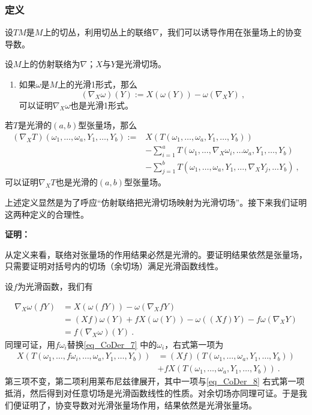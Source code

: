 \subsubsection{定义}
设$TM$是$M$上的切丛，利用切丛上的联络$\nabla$，我们可以诱导作用在张量场上的协变导数。
\begin{theorem}{}
设$M$上的仿射联络为$\nabla$；$X$与$Y$是光滑切场。
\begin{enumerate}
\item 如果$\omega$是$M$上的光滑1形式，那么
\begin{equation}\label{eq_CoDer_9}
\left(\nabla_X \omega\right)(Y):=X(\omega(Y))-\omega\left(\nabla_X Y\right)~,
\end{equation}
可以证明$\nabla_X \omega$也是光滑1形式。
\end{enumerate}
\end{theorem}
若$T$是光滑的$(a,b)$型张量场，那么
\begin{equation}\label{eq_CoDer_7}
\begin{aligned}
\left(\nabla_X T\right)\left(\omega_1, \ldots, \omega_a, Y_1, \ldots, Y_b\right):= & X\left(T\left(\omega_1, \ldots, \omega_a, Y_1, \ldots, Y_b\right)\right) \\
& -\sum_{i=1}^a T\left(\omega_1, \ldots, \nabla_X \omega_i, \ldots \omega_a, Y_1, \ldots, Y_b\right) \\
& -\sum_{j=1}^b T\left(\omega_1, \ldots, \omega_a, Y_1, \ldots, \nabla_X Y_j, \ldots Y_b\right)~,
\end{aligned}
\end{equation}
可以证明$\nabla_X T$也是光滑的$(a,b)$型张量场。

上述定义显然是为了呼应“仿射联络把光滑切场映射为光滑切场”。接下来我们证明这两种定义的合理性。

\textbf{证明：}

从定义来看，联络对张量场的作用结果必然是光滑的。要证明结果依然是张量场，只需要证明对括号内的切场（余切场）满足光滑函数线性。

设$f$为光滑函数，我们有

\begin{equation}
\begin{aligned}
\nabla_X\omega(fY)&=X(\omega(fY))-\omega(\nabla_XfY)\\
& =(X f) \omega(Y)+f X(\omega(Y))-\omega((X f) Y)-f \omega\left(\nabla_X Y\right) \\
& =f\left(\nabla_X \omega\right)(Y)~.
\end{aligned}
\end{equation}
同理可证，用$f\omega_i$替换\autoref{eq_CoDer_7} 中的$\omega_i$，右式第一项为
\begin{equation}\label{eq_CoDer_8}
\begin{aligned}
X\left(T\left(\omega_1, \ldots, f\omega_i,\ldots,\omega_a, Y_1, \ldots, Y_b\right)\right)&=(Xf)\left(T\left(\omega_1, \ldots,\omega_a, Y_1, \ldots, Y_b\right)\right)\\&+fX\left(T\left(\omega_1, \ldots,\omega_a, Y_1, \ldots, Y_b\right)\right)~.
\end{aligned}
\end{equation}
第三项不变，第二项利用莱布尼兹律展开，其中一项与\autoref{eq_CoDer_8} 右式第一项抵消，然后得到对任意切场是光滑函数线性的性质。对余切场亦同理可证。于是我们便证明了，协变导数对光滑张量场作用，结果依然是光滑张量场。
